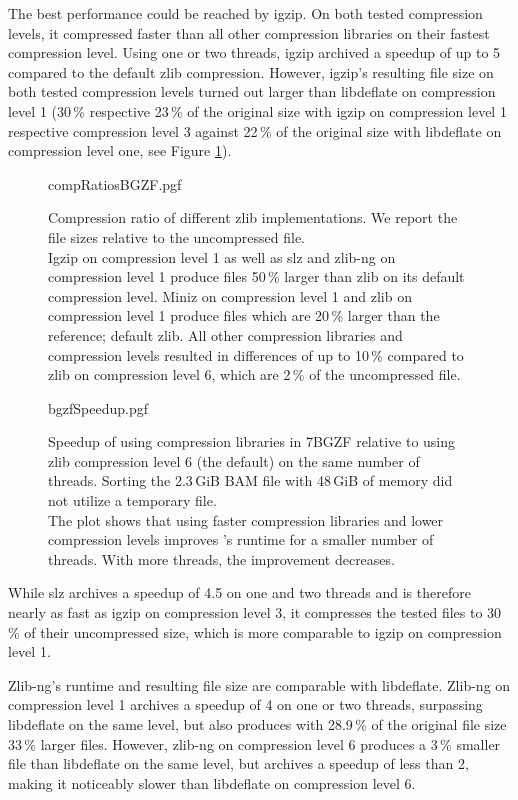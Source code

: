 The best performance could be reached by igzip. On both tested compression levels, it compressed faster than all other compression libraries on their fastest compression level. Using one or two threads, igzip archived a speedup of up to 5 compared to the default zlib compression. However, igzip's resulting file size on both tested compression levels turned out larger than libdeflate on compression level 1 (30\,\% respective 23\,\% of the original size with igzip on compression level 1 respective compression level 3 against 22\,\% of the original size with libdeflate on compression level one, see Figure \ref{fig:bgzfComps}). 

\begin{figure}[!htb]
        {compRatiosBGZF.pgf}
    \caption{Compression ratio of different zlib implementations. We report the file sizes relative to the uncompressed file. \\
    Igzip on compression level 1 as well as slz and zlib-ng on compression level 1 produce files 50\,\% larger than zlib on its default compression level. Miniz on compression level 1 and zlib on compression level 1 produce files which are 20\,\% larger than the reference; default zlib. All other compression libraries and compression levels resulted in differences of up to 10\,\% compared to zlib on compression level 6, which are 2\,\% of the uncompressed file.}
    \label{fig:bgzfComps}
\end{figure}
\begin{figure}[!htb]
        {bgzfSpeedup.pgf}
    \caption{Speedup of \sort using compression libraries in 7BGZF relative to \sort using zlib compression level 6 (the default) on the same number of threads.  Sorting the 2.3\,GiB BAM file with 48\,GiB of memory did not utilize a temporary file. \parents \threads \points \\
    The plot shows that using faster compression libraries and lower compression levels improves \sort's runtime for a smaller number of threads. With more threads, the improvement decreases.}
    \label{fig:bgzfspeed}
\end{figure}
While slz archives a speedup of 4.5 on one and two threads  and is therefore nearly as fast as igzip on compression level 3, it compresses the tested files to 30\,\% of their uncompressed size, which is more comparable to igzip on compression level 1.

Zlib-ng's runtime and resulting file size are comparable with libdeflate. Zlib-ng on compression level 1 archives a speedup of 4 on one or two threads, surpassing libdeflate on the same level, but also produces with 28.9\,\% of the original file size 33\,\% larger files. However, zlib-ng on compression level 6 produces a 3\,\% smaller file than libdeflate on the same level, but archives a speedup of less than 2, making it noticeably slower than libdeflate on compression level 6. 

